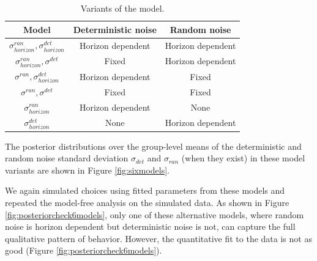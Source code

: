 \documentclass[12pt]{article}
\begin{document}
	\begin{table}[h]
		\small
		\centering
		\begin{tabular}{|c|c|c|}
			\hline
			Model & Deterministic noise & Random noise \\
			\hline
			$\sigma^{ran}_{horizon},\sigma^{det}_{horizon}$  & Horizon dependent & Horizon dependent\\
			\hline
			$\sigma^{ran}_{horizon},\sigma^{det}_{}$ & Fixed & Horizon dependent\\
			\hline
			$\sigma^{ran}_{},\sigma^{det}_{horizon}$ & Horizon dependent & Fixed\\
			\hline
			$\sigma^{ran}_{},\sigma^{det}_{}$ & Fixed & Fixed\\
			\hline
			$\sigma^{ran}_{horizon}$ & Horizon dependent & None\\
			\hline
			$\sigma^{det}_{horizon}$ & None & Horizon dependent\\
			\hline
		\end{tabular}
		\caption{Variants of the model.}
		\label{tab:models}	
	\end{table}

	The posterior distributions over the group-level means of the deterministic and random noise standard deviation $\sigma_{det}$ and $\sigma_{ran}$ (when they exist) in these model variants are shown in Figure \ref{fig:sixmodels}. 
	
	We again simulated choices using fitted parameters from these models and repeated the model-free analysis on the simulated data. As shown in Figure \ref{fig:posteriorcheck6models}, only one of these alternative models, where random noise is horizon dependent but deterministic noise is not, can capture the full qualitative pattern of behavior. However, the quantitative fit to the data is not as good (Figure \ref{fig:posteriorcheck6models}).%
	
\end{document}
